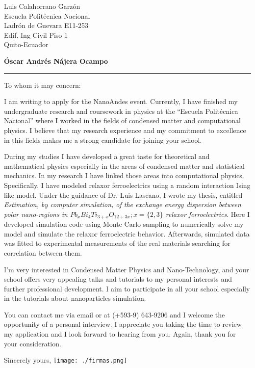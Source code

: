 \documentclass{letter}
\begin{document}
\signature{\vspace{-1.5cm}Óscar Nájera}           %
\address{Cap.Rafael Ramos E2-254 Casa \#2 \\
Quito,Ecuador\\
(+593-9) 643-9206\\
najera.oscar@gmail.com} 

\begin{letter}{Luis Calahorrano Garzón\\
Escuela Politécnica Nacional\\
Ladrón de Guevara E11-253\\
Edif. Ing Civil Piso 1\\
Quito-Ecuador}

\begin{flushleft}
{\large\bf Óscar Andrés Nájera Ocampo}
\end{flushleft}
\hrule height 1pt


\opening{To whom it may concern:}
\onehalfspacing

I am writing to apply for the NanoAndes event.
Currently, I have finished my undergraduate research and coursework in
physics at the ``Escuela Politécnica Nacional'' where I worked in the
fields of condensed matter and computational physics. I believe
that my research experience and my commitment to excellence in
this fields makes me a strong candidate for joining your school.

During my studies I have developed a great taste for theoretical and
mathematical physics especially in the areas of condensed matter
and statistical mechanics. In my research I have linked those areas into
computational physics. Specifically, I have modeled relaxor
ferroelectrics using a random interaction Ising like model. Under
the guidance of Dr. Luis Lascano, I wrote my thesis, entitled
\textit{Estimation, by computer simulation, of the exchange energy
dispersion between polar nano-regions in
$Pb_xBi_4Ti_{3+x}O_{12+3x}; x=\{2,3\}$ relaxor ferroelectrics}.
Here I developed simulation code using Monte Carlo sampling to numerically
solve my model and simulate the relaxor ferroelectric behavior.
Afterwards, simulated data was fitted to experimental measurements
of the real materials searching for correlation between them.

I'm very interested in Condensed Matter Physics and Nano-Technology,
and your school offers very appealing talks and tutorials to my
personal interests and further professional development. I aim to
participate in all your school especially in the tutorials about
nanoparticles simulation.

You can contact me via email or at (+593-9) 643-9206 and I welcome
the opportunity of a personal interview. I appreciate
you taking the time to review my application and I look forward to
hearing from you. Again, thank you for your consideration. 

\closing{Sincerely yours,\vspace{0.5cm}
\texttt{[image: ./firmas.png]}
}
\end{letter}
\end{document}

